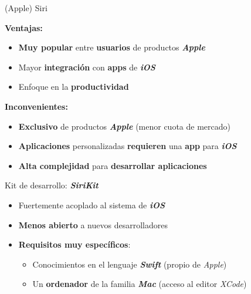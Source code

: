\documentclass{beamer}
\begin{document}
  \begin{frame}[label=apple-siri]{ (Apple) Siri}
    {
      \textbf{Ventajas:}
      \vspace{1.5em}
      \begin{itemize}
        \setlength\itemsep{1.5em}
        \item \textbf{Muy popular} entre \textbf{usuarios} de productos \textbf{\emph{Apple}}
        \item Mayor \textbf{integración} con \textbf{apps} de \textbf{\emph{iOS}}
        \item Enfoque en la \textbf{productividad}
      \end{itemize}
    }
    {
      \textbf{Inconvenientes:}
      \vspace{1.5em}
      \begin{itemize}
        \setlength\itemsep{1.5em}
        \item \textbf{Exclusivo} de productos \textbf{\emph{Apple}} {\small(menor cuota de mercado)}
        \item \textbf{Aplicaciones} personalizadas \textbf{requieren} una \textbf{app} para \textbf{\emph{iOS}}
        \item \textbf{Alta complejidad} para \textbf{desarrollar aplicaciones}
      \end{itemize}
    }
    {
      Kit de desarrollo: \textbf{\emph{SiriKit}}
      \vspace{.7em}
      \begin{itemize}
        \setlength\itemsep{1.5em}
        \item Fuertemente acoplado al sistema de \textbf{\textit{iOS}}
        \item \textbf{Menos abierto} a nuevos desarrolladores
        \item \textbf{Requisitos muy específicos}:
        \vspace{.5em}
          \begin{itemize}
            \setlength\itemsep{.7em}
            \item Conocimientos en el lenguaje \textbf{\emph{Swift}} (propio de \emph{Apple})
            \item Un \textbf{ordenador} de la familia \textbf{\emph{Mac}}
            (acceso al editor \emph{XCode})
          \end{itemize}
      \end{itemize}
    }
  \end{frame}
\end{document}
